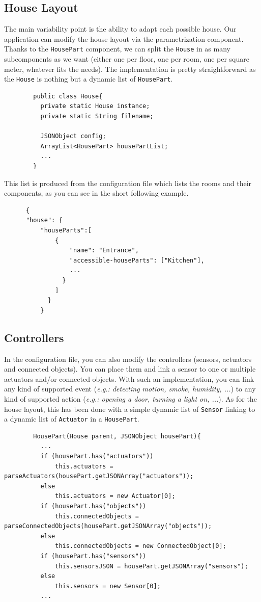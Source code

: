     \subsection{House Layout}
      The main variability point is the ability to adapt each possible house. Our application can modify the house layout via the parametrization component. Thanks to the \texttt{HousePart} component, we can split the \texttt{House} in as many subcomponents as we want (either one per floor, one per room, one per square meter, whatever fits the needs). The implementation is pretty straightforward as the \texttt{House} is nothing but a dynamic list of \texttt{HousePart}.
      \begin{verbatim}
        public class House{
          private static House instance;
          private static String filename;

          JSONObject config;
          ArrayList<HousePart> housePartList;
          ...
        }
      \end{verbatim}
      This list is produced from the configuration file which lists the rooms and their components, as you can see in the short following example.
      \begin{verbatim}
      {
      "house": {
          "houseParts":[
              {
                  "name": "Entrance",
                  "accessible-houseParts": ["Kitchen"],
                  ...
                }
              ]
            }
          }
      \end{verbatim}

    \subsection{Controllers}
      In the configuration file, you can also modify the controllers (sensors, actuators and connected objects). You can place them and link a sensor to one or multiple actuators and/or connected objects. With such an implementation, you can link any kind of supported event (\emph{e.g.: detecting motion, smoke, humidity, ...}) to any kind of supported action (\emph{e.g.: opening a door, turning a light on, ...}). As for the house layout, this has been done with a simple dynamic list of \texttt{Sensor} linking to a dynamic list of \texttt{Actuator} in a \texttt{HousePart}.
      \begin{verbatim}
        HousePart(House parent, JSONObject housePart){
          ...
          if (housePart.has("actuators"))
              this.actuators = parseActuators(housePart.getJSONArray("actuators"));
          else
              this.actuators = new Actuator[0];
          if (housePart.has("objects"))
              this.connectedObjects = parseConnectedObjects(housePart.getJSONArray("objects"));
          else
              this.connectedObjects = new ConnectedObject[0];
          if (housePart.has("sensors"))
              this.sensorsJSON = housePart.getJSONArray("sensors");
          else
              this.sensors = new Sensor[0];
          ...
      \end{verbatim}

